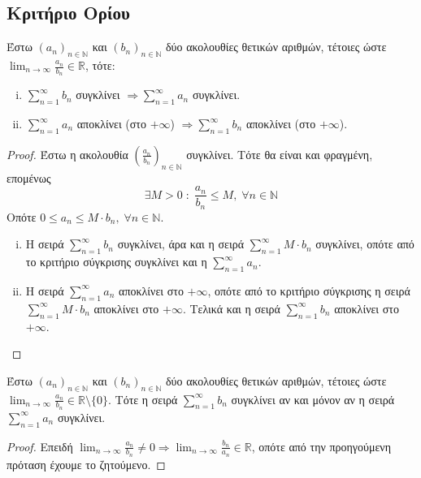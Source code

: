 \documentclass[a4paper,table]{report}
\begin{document}
\subsection{Κριτήριο Ορίου}
\begin{mybox2}
\begin{thm}
Έστω $ {(a_{n})}_{n \in \mathbb{N}} $ και $ {(b_{n})}_{n \in \mathbb{N}} $ δύο 
    ακολουθίες θετικών αριθμών, τέτοιες ώστε $ \lim_{n \to \infty} \frac{a_{n}}{b_{n}}
    \in \mathbb{R} $, τότε: 
    \begin{enumerate}[i)]
        \item $ \sum_{n=1}^{\infty} b_{n} $ συγκλίνει $ \Rightarrow 
            \sum_{n=1}^{\infty} a_{n} $ συγκλίνει.
        \item $ \sum_{n=1}^{\infty} a_{n} $ αποκλίνει (στο $+ \infty$) $ \Rightarrow 
            \sum_{n=1}^{\infty} b_{n} $ αποκλίνει (στο $+ \infty$).
\end{enumerate}
\end{thm}
\end{mybox2}

\begin{proof}
\item {}
    Έστω η ακολουθία $ {\left(\frac{a_{n}}{b_{n}}\right)}_{n \in \mathbb{N}} $ 
    συγκλίνει.  Τότε θα είναι και φραγμένη, επομένως
    \[
        \exists M>0 \; : \; \frac{a_{n}}{b_{n}} \leq M, \; \forall n \in \mathbb{N} 
    \] 
    Οπότε $ 0 \leq a_{n} \leq M\cdot b_{n}, \; \forall n \in \mathbb{N} $.
    \begin{enumerate}[i)]
        \item Η σειρά $ \sum_{n=1}^{\infty} b_{n} $ συγκλίνει, άρα και η σειρά 
            $ \sum_{n=1}^{\infty} M\cdot b_{n} $ συγκλίνει, οπότε από το κριτήριο 
            σύγκρισης συγκλίνει και η $ \sum_{n=1}^{\infty} a_{n} $.
        \item Η σειρά $ \sum_{n=1}^{\infty} a_{n} $ αποκλίνει στο $ + \infty $, 
            οπότε από το κριτήριο σύγκρισης η σειρά 
            $ \sum_{n=1}^{\infty} M \cdot b_{n} $ αποκλίνει
            στο $ + \infty $. Τελικά και η σειρά $ \sum_{n=1}^{\infty} b_{n} $ 
            αποκλίνει στο $ + \infty $.
    \end{enumerate}
\end{proof}

\begin{cor}
    Έστω $ {(a_{n})}_{n \in \mathbb{N}} $ και $ {(b_{n})}_{n \in \mathbb{N}} $ δύο 
    ακολουθίες θετικών αριθμών, τέτοιες ώστε $ \lim_{n \to \infty} \frac{a_{n}}{b_{n}} 
    \in \mathbb{R} \setminus \{ 0 \}$. Τότε η σειρά $ \sum_{n=1}^{\infty} b_{n} $ 
    συγκλίνει αν και μόνον αν η σειρά $ \sum_{n=1}^{\infty} a_{n} $ συγκλίνει.
\end{cor}
\begin{proof}
    Επειδή $ \lim_{n \to \infty} \frac{a_{n}}{b_{n}} \neq 0 \Rightarrow \lim_{n \to
    \infty} \frac{b_{n}}{a_{n}} \in \mathbb{R} $, οπότε από την προηγούμενη πρόταση 
    έχουμε το ζητούμενο.
\end{proof}
\end{document}
